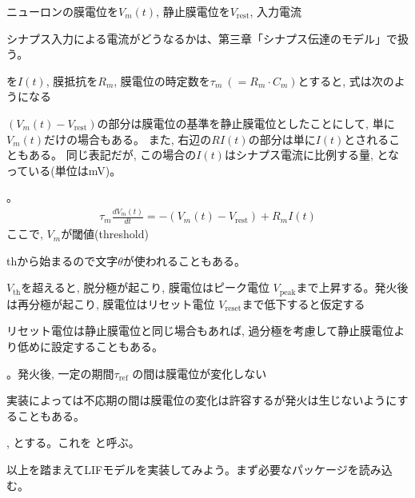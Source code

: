 \documentclass[letterpaper,10pt,english]{sphinxmanual}
\begin{document}
ニューロンの膜電位を\(V_m(t)\), 静止膜電位を\(V_\text{rest}\), 入力電流%
\begin{footnote}[2]\sphinxAtStartFootnote
シナプス入力による電流がどうなるかは、第三章「シナプス伝達のモデル」で扱う。
%
\end{footnote}を\(I(t)\), 膜抵抗を\(R_m\), 膜電位の時定数を\(\tau_m\ (=R_m \cdot C_m)\)とすると, 式は次のようになる%
\begin{footnote}[3]\sphinxAtStartFootnote
\((V_{m}(t)-V_\text{rest})\)の部分は膜電位の基準を静止膜電位としたことにして, 単に\(V_m(t)\)だけの場合もある。 また, 右辺の\(RI(t)\)の部分は単に\(I(t)\)とされることもある。 同じ表記だが, この場合の\(I(t)\)はシナプス電流に比例する量, となっている(単位はmV)。
%
\end{footnote}。
\begin{equation*}
\begin{split}
\begin{equation}
\tau_m \frac{dV_{m}(t)}{dt}=-(V_{m}(t)-V_\text{rest})+R_mI(t)
\end{equation}
\end{split}
\end{equation*}
ここで, \(V_m\)が閾値(threshold)%
\begin{footnote}[4]\sphinxAtStartFootnote
thから始まるので文字\(\theta\)が使われることもある。
%
\end{footnote}\(V_{\text{th}}\)を超えると, 脱分極が起こり, 膜電位はピーク電位 \(V_{\text{peak}}\)まで上昇する。発火後は再分極が起こり, 膜電位はリセット電位 \(V_{\text{reset}}\)まで低下すると仮定する%
\begin{footnote}[5]\sphinxAtStartFootnote
リセット電位は静止膜電位と同じ場合もあれば, 過分極を考慮して静止膜電位より低めに設定することもある。
%
\end{footnote}。発火後, 一定の期間\(\tau_{\text{ref}}\) の間は膜電位が変化しない%
\begin{footnote}[6]\sphinxAtStartFootnote
実装によっては不応期の間は膜電位の変化は許容するが発火は生じないようにすることもある。
%
\end{footnote}, とする。これを  と呼ぶ。

以上を踏まえてLIFモデルを実装してみよう。まず必要なパッケージを読み込む。

\begin{sphinxVerbatim}[commandchars=\\\{\}]
  
   
\end{sphinxVerbatim}
\end{document}
